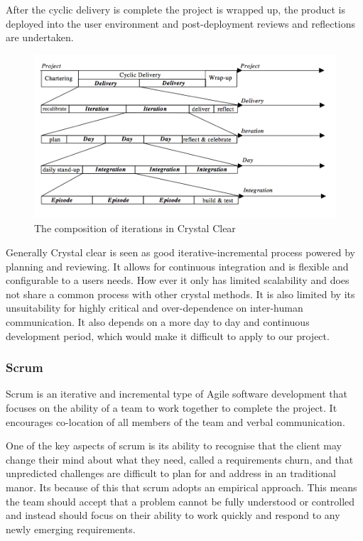 \documentclass[11pt,a4paper]{article}
\begin{document}
After the cyclic delivery is complete the project is wrapped up, the product is deployed into the user environment and post-deployment reviews and reflections are undertaken. 

\begin{figure}[H]
\centering
\includegraphics[width = 140mm]{clear.png}
\caption{The composition of iterations in Crystal Clear ~\cite{Cockburn}}
\label{fig:clear}
\end{figure}

Generally Crystal clear is seen as good iterative-incremental process powered by planning and reviewing. It allows for continuous integration and is flexible and configurable to a users needs. How ever it only has limited scalability and does not share a common process with other crystal methods. It is also limited by its unsuitability for highly critical and over-dependence on inter-human communication. It also depends on a more day to day and continuous development period, which would make it difficult to apply to our project. 

\subsubsection{Scrum}
Scrum is an iterative and incremental type of Agile software development that focuses on the ability of a team to work together to complete the project. It encourages co-location of all members of the team and verbal communication. 

One of the key aspects of scrum is its ability to recognise that the client may change their mind about what they need, called a requirements churn, and that unpredicted challenges are difficult to plan for and address in an traditional manor. Its because of this that scrum adopts an empirical approach. This means the team should accept that a problem cannot be fully understood or controlled and instead should focus on their ability to work quickly and respond to any newly emerging requirements. 
\end{document}
